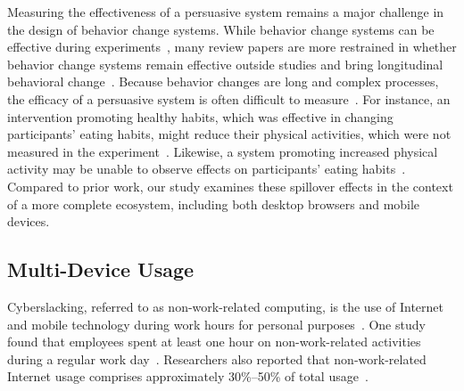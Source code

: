 Measuring the effectiveness of a persuasive system remains a major challenge in the design of behavior change systems. While behavior change systems can be effective during experiments~\cite{doi:10.1080/15228830802094429, Cuijpers2008, info:doi/10.2196/jmir.1376}, many review papers are more restrained in whether behavior change systems remain effective outside studies and bring longitudinal behavioral change~\cite{doi:10.1111/j.1467-789X.2009.00646.x, 10.1371/journal.pmed.1000387, NORMAN2007336, 10.1007/978-3-319-07127-5_11}. Because behavior changes are long and complex processes, the efficacy of a persuasive system is often difficult to measure~\cite{prochaska1997transtheoretical}. For instance, an intervention promoting healthy habits, which was effective in changing participants' eating habits, might reduce their physical activities, which were not measured in the experiment~\cite{COTTER2014243}. Likewise, a system promoting increased physical activity may be unable to observe effects on participants' eating habits~\cite{doi:10.1111/j.1740-9713.2015.00863.x}. Compared to prior work, our study examines these spillover effects in the context of a more complete ecosystem, including both desktop browsers and mobile devices. %

\subsection{Multi-Device Usage}
Cyberslacking, referred to as non-work-related computing, is the use of Internet and mobile technology during work hours for personal purposes~\cite{VITAK20111751,PEE2008120, Pamela2004, lim2002}. One study found that employees spent at least one hour on non-work-related activities during a regular work day~\cite{VITAK20111751}. Researchers also reported that non-work-related Internet usage comprises approximately 30\%--50\% of total usage~\cite{RESTUBOG2011247,JAMALUDDIN2015495}. %


